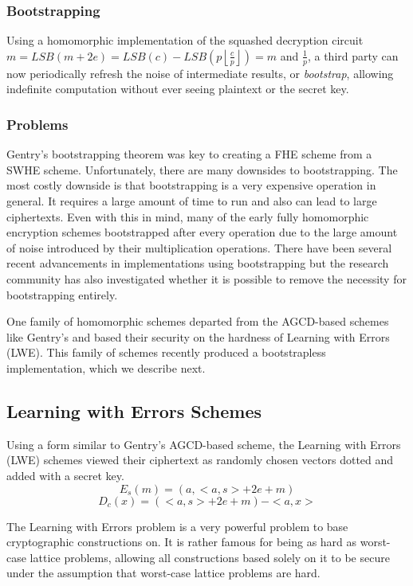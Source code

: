 \documentclass[letterpaper,twocolumn,10pt]{article}
\newcommand{\floor}[1]{\left\lfloor #1 \right\rfloor}
\begin{document}
\subsubsection{Bootstrapping}

Using a homomorphic implementation of the squashed decryption circuit $m = LSB(m + 2e) = LSB(c) - LSB(p\floor{\frac{c}{p}}) = m$ and $\frac{1}{p}$, a third party can now periodically refresh the noise of intermediate results, or \emph{bootstrap}, allowing indefinite computation without ever seeing plaintext or the secret key.


\subsubsection{Problems}
Gentry's bootstrapping theorem was key to creating a FHE scheme from a SWHE scheme. Unfortunately, there are many downsides to bootstrapping. The most costly downside is that bootstrapping is a very expensive operation in general. It requires a large amount of time to run\cite{ImplementingGentry} and also can lead to large ciphertexts. Even with this in mind, many of the early fully homomorphic encryption schemes bootstrapped after every operation due to the large amount of noise introduced by their multiplication operations. There have been several recent advancements in implementations using bootstrapping\cite{StehleSteinfeld, SmartVercauteren, ImplementingGentry, CNT} but the research community has also investigated whether it is possible to remove the necessity for bootstrapping entirely. 

One family of homomorphic schemes departed from the AGCD-based schemes like Gentry's and based their security on the hardness of Learning with Errors (LWE). This family of schemes recently produced a bootstrapless implementation, which we describe next.

\subsection{Learning with Errors Schemes}
\label{sec:lwe}
Using a form similar to Gentry's AGCD-based scheme, the Learning with Errors (LWE) schemes\cite{SansBootstrapping} viewed their ciphertext as randomly chosen vectors dotted and added with a secret key.
$$E_s(m) = (a, <a,s> + 2e + m)$$
$$D_c(x) = (<a,s> + 2e + m) - <a,x>$$

The Learning with Errors problem is a very powerful problem to base cryptographic constructions on. It is rather famous for being as hard as worst-case lattice problems, allowing all constructions based solely on it to be secure under the assumption that worst-case lattice problems are hard.
\end{document}
